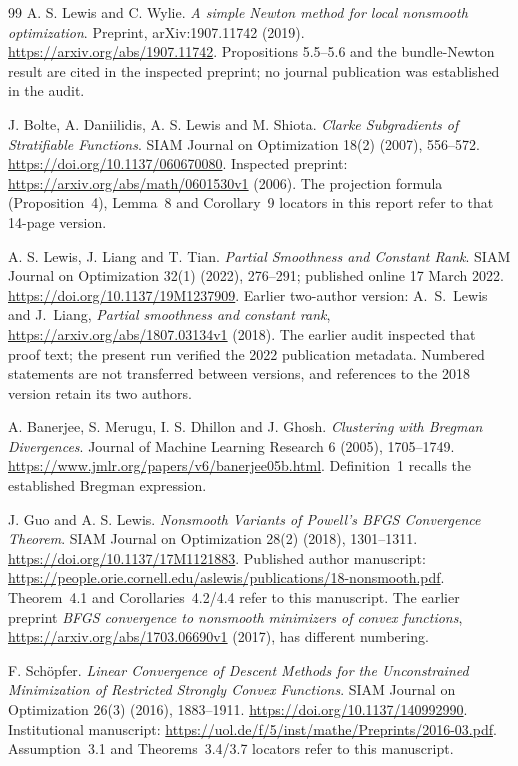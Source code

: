 \begin{thebibliography}{99}
A. S. Lewis and C. Wylie. \emph{A simple Newton method for local nonsmooth optimization}. Preprint, arXiv:1907.11742 (2019). \url{https://arxiv.org/abs/1907.11742}. Propositions 5.5--5.6 and the bundle-Newton result are cited in the inspected preprint; no journal publication was established in the audit.

J. Bolte, A. Daniilidis, A. S. Lewis and M. Shiota. \emph{Clarke Subgradients of Stratifiable Functions}. SIAM Journal on Optimization 18(2) (2007), 556--572. \url{https://doi.org/10.1137/060670080}. Inspected preprint: \url{https://arxiv.org/abs/math/0601530v1} (2006). The projection formula (Proposition~4), Lemma~8 and Corollary~9 locators in this report refer to that 14-page version.

A. S. Lewis, J. Liang and T. Tian. \emph{Partial Smoothness and Constant Rank}. SIAM Journal on Optimization 32(1) (2022), 276--291; published online 17 March 2022. \url{https://doi.org/10.1137/19M1237909}. Earlier two-author version: A.~S.~Lewis and J.~Liang, \emph{Partial smoothness and constant rank}, \url{https://arxiv.org/abs/1807.03134v1} (2018). The earlier audit inspected that proof text; the present run verified the 2022 publication metadata. Numbered statements are not transferred between versions, and references to the 2018 version retain its two authors.

A. Banerjee, S. Merugu, I. S. Dhillon and J. Ghosh. \emph{Clustering with Bregman Divergences}. Journal of Machine Learning Research 6 (2005), 1705--1749. \url{https://www.jmlr.org/papers/v6/banerjee05b.html}. Definition~1 recalls the established Bregman expression.

J. Guo and A. S. Lewis. \emph{Nonsmooth Variants of Powell's BFGS Convergence Theorem}. SIAM Journal on Optimization 28(2) (2018), 1301--1311. \url{https://doi.org/10.1137/17M1121883}. Published author manuscript: \url{https://people.orie.cornell.edu/aslewis/publications/18-nonsmooth.pdf}. Theorem~4.1 and Corollaries~4.2/4.4 refer to this manuscript. The earlier preprint \emph{BFGS convergence to nonsmooth minimizers of convex functions}, \url{https://arxiv.org/abs/1703.06690v1} (2017), has different numbering.

F. Sch\"opfer. \emph{Linear Convergence of Descent Methods for the Unconstrained Minimization of Restricted Strongly Convex Functions}. SIAM Journal on Optimization 26(3) (2016), 1883--1911. \url{https://doi.org/10.1137/140992990}. Institutional manuscript: \url{https://uol.de/f/5/inst/mathe/Preprints/2016-03.pdf}. Assumption~3.1 and Theorems~3.4/3.7 locators refer to this manuscript.


\end{thebibliography}
